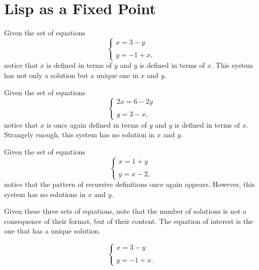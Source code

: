 \section{Lisp as a Fixed Point}
\label{section: Lisp as a Fixed Point}


  Given the set of equations \[\begin{cases} x = 3 - y \\ \\ y = - 1 + x, \end{cases}\] notice that $x$ is defined in terms of $y$ and $y$ is defined in terms of $x$. This system has not only a solution but a unique one in $x$ and $y$.

  Given the set of equations \[\begin{cases} 2x = 6 - 2y \\ \\ y = 3 - x, \end{cases}\] notice that $x$ is once again defined in terms of $y$ and $y$ is defined in terms of $x$. Strangely enough, this system has no solution in $x$ and $y$.

  Given the set of equations \[\begin{cases} x = 1 + y \\ \\ y = x - 2, \end{cases}\] notice that the pattern of recursive definitions once again appears. However, this system has no solutions in $x$ and $y$.

  Given these three sets of equations, note that the number of solutions is not a consequence of their format, but of their content. The equation of interest is the one that has a unique solution.

  \[\begin{cases} x = 3 - y \\ \\ y = - 1 + x. \end{cases}\]

